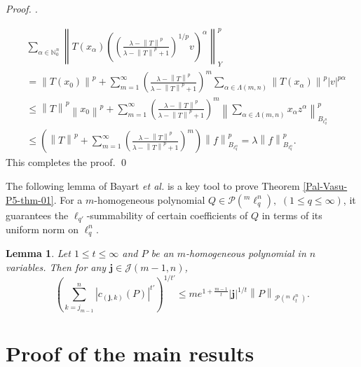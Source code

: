 \documentclass[a4paper,12pt]{amsart}
\newtheorem{lem}[equation]{Lemma}
\theoremstyle{definition}
\newenvironment{pf}[1][]{%
 \vskip 3mm
 \noindent
 \ifthenelse{\equal{#1}{}}%
  {{\slshape Proof. }}%
  {{\slshape #1.} }%
 }%
{\qed\bigskip}
\newcommand{\norm}[1]{\left\lVert#1\right\rVert}
\begin{document}
\begin{pf}
\begin{align*}
		&	\sum_{\alpha\in \mathbb{N}^n_{0}} \norm{T(x_{\alpha})\left(\left(\frac{\lambda-\norm{T}^p}{\lambda-\norm{T}^p+1}\right)^{1/p} v\right)^{\alpha}}^p_{Y}\\[2mm]&=
		\norm{T(x_0)}^p+\sum_{m=1}^{\infty}\left(\frac{\lambda-\norm{T}^p}{\lambda-\norm{T}^p+1}\right)^{m}\sum_{\alpha \in\Lambda(m,n)}\norm{T(x_{\alpha})}^p|v|^{p\alpha}\\[2mm]&
		\leq \norm{T}^p\norm{x_0}^p + \sum_{m=1}^{\infty}\left(\frac{\lambda-\norm{T}^p}{\lambda-\norm{T}^p+1}\right)^{m}  \norm{\sum_{\alpha \in\Lambda(m,n)}x_{\alpha}z^{\alpha}}^p_{B_{\ell^n_q}}\\[2mm]&
		\leq \left(\norm{T}^p +  \sum_{m=1}^{\infty} \left(\frac{\lambda-\norm{T}^p}{\lambda-\norm{T}^p+1}\right)^m\right)\norm{f}^p_{B_{\ell^n_q}}=\lambda \norm{f}^p_{B_{\ell^n_q}}.
	\end{align*}
	This completes the proof.
\end{pf}

The following lemma of Bayart {\it et al.} \cite[Lemma 3.5]{bayart-J-Anal-2019} is a key tool to prove Theorem \ref{Pal-Vasu-P5-thm-01}. For a $m$-homogeneous polynomial $Q\in \mathcal{P}(^m\ell^n_q), \,\,(1\leq q\leq \infty)$, it guarantees the $\ell_{q'}$-summability of certain coefficients of $Q$ in terms of its uniform norm on $\ell^n_q$.

\begin{lem}\cite{bayart-J-Anal-2019}\label{Pal-Vasu-P5-Lemma-02}
	Let $1\leq t\leq \infty$ and $P$ be an $m$-homogeneous polynomial in $n$ variables. Then for any $\mathbf{j}\in \mathcal{J}(m-1, n)$,
	\begin{equation*}
		\left(\sum_{k=j_{m-1}}^{n}|c_{(\mathbf{j},k)}(P)|^{t'}\right)^{1/t'}\leq me^{1+\frac{m-1}{t}}|\mathbf{j}|^{1/t}\norm{P}_{\mathcal{P}(^m\ell^n_t)}.
	\end{equation*}
\end{lem}

\section{Proof of the main results}\label{Pal-Vasu-P5-section-05}
\end{document}
